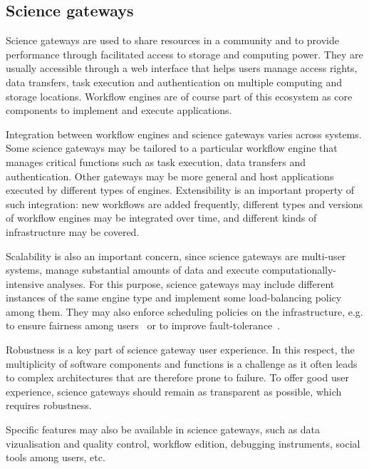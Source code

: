 \documentclass[preprint,3p,twocolumn]{elsarticle}
\begin{document}
\subsection{Science gateways}

Science gateways 
are used to share resources in a community and to provide performance
through facilitated access to storage and computing power. They are
usually accessible through a web interface that helps users manage
access rights, data transfers, task execution and authentication on
multiple computing and storage locations. Workflow engines are of
course part of this ecosystem as core components to implement and
execute applications.


Integration between workflow engines and science gateways varies
across systems. Some science gateways may be tailored to a particular
workflow engine that manages critical functions such as task
execution, data transfers and authentication. Other gateways may be
more general and host applications executed by different types of
engines. Extensibility is an important property of such integration:
new workflows are added frequently, different types and versions of
workflow engines may be integrated over time, and different kinds of
infrastructure may be covered.

Scalability is also an important concern, since science gateways are
multi-user systems, manage substantial amounts of data and execute
computationally-intensive analyses. For this purpose, science gateways
may include different instances of the same engine type and implement
some load-balancing policy among them. They may also enforce
scheduling policies on the infrastructure, e.g. to ensure fairness
among users~\cite{FERR-14,CPE:CPE3708} or to improve
fault-tolerance~\cite{wilkins2008teragrid,FERR-13}.

Robustness is a key part of science gateway user experience. In this
respect, the multiplicity of software components and functions is a
challenge as it often leads to complex architectures that are
therefore prone to failure. To offer good user experience, science
gateways should remain as transparent as possible, which requires
robustness. 

Specific features may also be available in science
gateways, such as data vizualisation and quality control, workflow
edition, debugging instruments, social tools among users, etc.
\end{document}
